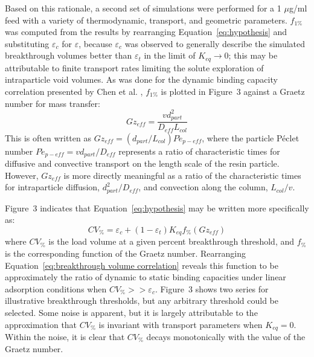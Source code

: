 \documentclass[preprint,review,12pt]{elsarticle}
\begin{document}
        
        Based on this rationale, a second set of simulations were performed for a 1 $\mu$g/ml feed with a variety of thermodynamic, transport, and geometric parameters. $f_{1\%}$ was computed from the results by rearranging Equation~\ref{eq:hypothesis} and substituting $\varepsilon_c$ for $\varepsilon$, because $\varepsilon_c$ was observed to generally describe the simulated breakthrough volumes better than $\varepsilon_t$ in the limit of $K_{eq} \to 0$; this may be attributable to finite transport rates limiting the solute exploration of intraparticle void volumes. As was done for the dynamic binding capacity correlation presented by Chen et al. \cite{Chen2020}, $f_{1\%}$ is plotted in Figure~3 against a Graetz number for mass transfer:
        \begin{equation} \label{eq:dimensionless group}
            Gz_{eff} = \frac{v d_{part}^2}{D_{eff} L_{col}}
        \end{equation}
        This is often written as $Gz_{eff} = \left( d_{part}/L_{col} \right) P\acute{e}_{p - eff}$, where the particle P\'eclet number $P\acute{e}_{p - eff} = v d_{part}/D_{eff}$ represents a ratio of characteristic times for diffusive and convective transport on the length scale of the resin particle. However, $Gz_{eff}$ is more directly meaningful as a ratio of the characteristic times for intraparticle diffusion, $d_{part}^2/D_{eff}$, and convection along the column, $L_{col}/v$.


        Figure~3 indicates that Equation~\ref{eq:hypothesis} may be written more specifically as:
        \begin{equation} \label{eq:breakthrough volume correlation}
            CV_\% = \varepsilon_c + (1 - \varepsilon_t) K_{eq} f_\% \left( Gz_{eff} \right)
        \end{equation}
        where $CV_\%$ is the load volume at a given percent breakthrough threshold, and $f_\%$ is the corresponding function of the Graetz number. Rearranging Equation~\ref{eq:breakthrough volume correlation} reveals this function to be approximately the ratio of dynamic to static binding capacities under linear adsorption conditions when $CV_\% >> \varepsilon_c$. Figure~3 shows two series for illustrative breakthrough thresholds, but any arbitrary threshold could be selected. Some noise is apparent, but it is largely attributable to the approximation that $CV_\%$ is invariant with transport parameters when $K_{eq} = 0$. Within the noise, it is clear that $CV_\%$ decays monotonically with the value of the Graetz number.
\end{document}

